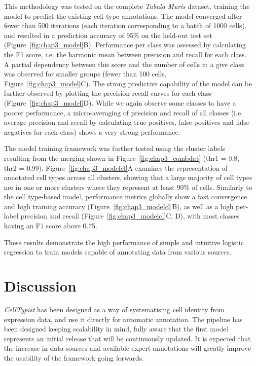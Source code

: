 This methodology was tested on the complete \textit{Tabula Muris} dataset, training the model to predict the existing cell type annotations. The model converged after fewer than 500 iterations (each iteration corresponding to a batch of 1000 cells), and resulted in a prediction accuracy of 95\% on the held-out test set (Figure~\ref{fig:chap3_model}B). Performance per class was assessed by calculating the F1 score, i.e. the harmonic mean between precision and recall for each class. A partial dependency between this score and the number of cells in a give class was observed for smaller groups (fewer than 100 cells, Figure~\ref{fig:chap3_model}C). The strong predictive capability of the model can be further observed by plotting the precision-recall curves for each class (Figure~\ref{fig:chap3_model}D). While we again observe some classes to have a poorer performance, a micro-averaging of precision and recall of all classes (i.e. average precision and recall by calculating true positives, false positives and false negatives for each class) shows a very strong performance.

The model training framework was further tested using the cluster labels resulting from the merging shown in Figure~\ref{fig:chap3_combdat} (thr1 = 0.8, thr2 = 0.99). Figure~\ref{fig:chap3_modelcl}A examines the representation of annotated cell types across all clusters, showing that a large majority of cell types are in one or more clusters where they represent at least 90\% of cells. Similarly to the cell type-based model, performance metrics globally show a fast convergence and high training accuracy (Figure~\ref{fig:chap3_modelcl}B), as well as a high per-label precision and recall (Figure~\ref{fig:chap3_modelcl}C, D), with most classes having an F1 score above 0.75.

These results demonstrate the high performance of simple and intuitive logistic regression to train models capable of annotating data from various sources.



\section{Discussion}
\label{section3.5}
\textit{CellTypist} has been designed as a way of systematising cell identity from expression data, and use it directly for automatic annotation. The pipeline has been designed keeping scalability in mind, fully aware that the first model represents an initial release that will be continuously updated. It is expected that the increase in data sources and available expert annotations will greatly improve the usability of the framework going forwards.

